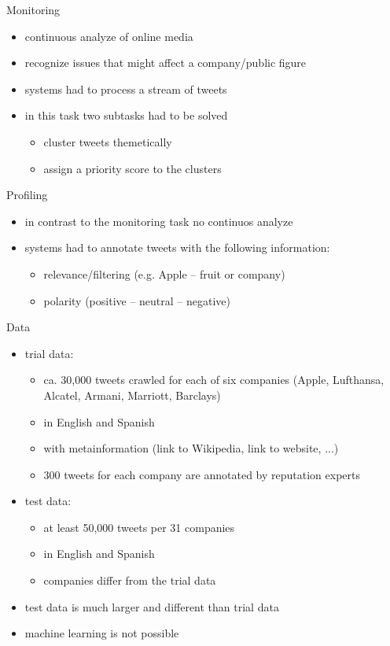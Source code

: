 \documentclass[12pt,a4paper]{beamer}
\begin{document}
\begin{frame}{Monitoring}
\begin{itemize}
\item continuous analyze of online media
\item recognize issues that might affect a company/public figure
\item systems had to process a stream of tweets
\item in this task two subtasks had to be solved
\begin{itemize}
\item cluster tweets themetically
\item assign a priority score to the clusters
\end{itemize}
\end{itemize}
\end{frame}

\begin{frame}{Profiling}
\begin{itemize}
\item in contrast to the monitoring task no continuos analyze
\item systems had to annotate tweets with the following information:
\begin{itemize}
\item relevance/filtering (e.g. Apple -- fruit or company)
\item polarity (positive -- neutral -- negative)
\end{itemize}
\end{itemize}
\end{frame}

\begin{frame}{Data}
\begin{itemize}
\item trial data:
\begin{itemize}
\item ca. 30,000 tweets crawled for each of six companies (Apple, Lufthansa, Alcatel, Armani, Marriott, Barclays)
\item in English and Spanish
\item with metainformation (link to Wikipedia, link to website, ...)
\item 300 tweets for each company are annotated by reputation experts
\end{itemize}
\item test data:
\begin{itemize}
\item at least 50,000 tweets per 31 companies
\item in English and Spanish
\item companies differ from the trial data
\end{itemize}
\item test data is much larger and different than trial data
\item machine learning is not possible
\end{itemize}
\end{frame}
\end{document}
